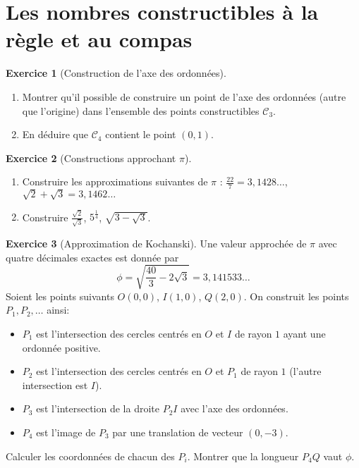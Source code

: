 \documentclass[11pt,a4paper]{article}
\theoremstyle{definition}
\newtheorem{exo}{Exercice}
\newcommand{\exercice}[1]{} \newcommand{\finexercice}{}
\newcommand{\enonce}{\begin{exo}} \newcommand{\finenonce}{\end{exo}}
\begin{document}
\section{Les nombres constructibles à la règle et au compas}


\exercice{}
\enonce[Construction de l'axe des ordonnées]
\begin{enumerate}
  \item Montrer qu'il possible de construire un point de l'axe des ordonnées 
  (autre que l'origine) dans l'ensemble des points constructibles $\mathcal{C}_3$.
  
  \item En déduire que $\mathcal{C}_4$ contient le point $(0,1)$.
\end{enumerate}
\finenonce
\finexercice


\exercice{}
\enonce[Constructions approchant $\pi$]
\ 
\begin{enumerate}
 \item Construire les approximations suivantes de $\pi$ : 
$\frac{22}{7}=3,1428\ldots$, $\sqrt{2}+\sqrt{3}=3,1462\ldots$
 
 \item Construire $\frac{\sqrt{2}}{\sqrt{3}}$, $5^{\frac{1}{4}}$, $\sqrt{3-\sqrt{3}}$. 
     
\end{enumerate}
\finenonce

\finexercice


\exercice{}
\enonce[Approximation de Kochanski]
Une valeur approchée de $\pi$ avec quatre décimales exactes est donnée par
$$\phi = \sqrt{\frac{40}{3} - 2 \sqrt{3}} = 3,141533\ldots$$
Soient les points suivants $O(0,0)$, $I(1,0)$, $Q(2,0)$. 
On construit les points $P_1, P_2,\ldots$ ainsi:
\begin{itemize}
 \item $P_1$ est l'intersection des cercles centrés en $O$ et $I$ de rayon $1$ ayant une ordonnée positive.
 \item $P_2$ est l'intersection des cercles centrés en $O$ et $P_1$ de rayon $1$ (l'autre intersection est $I$).
 \item $P_3$ est l'intersection de  la droite $P_2I$ avec l'axe des ordonnées.
 \item $P_4$ est l'image de $P_3$ par une translation de vecteur $(0,-3)$.
\end{itemize}
Calculer les coordonnées de chacun des $P_i$.
Montrer que la longueur $P_4Q$ vaut $\phi$.
\finenonce
\end{document}
